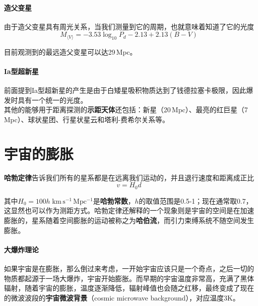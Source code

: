 \documentclass[openany]{ctexbook}
\begin{document}
\paragraph{造父变星}
由于造父变星具有周光关系，当我们测量到它的周期，也就意味着知道了它的光度
\begin{equation}
  M_{\langle V\rangle}=-3.53\log_{10}P_d-2.13+2.13(B-V)
\end{equation}

目前观测到的最远造父变星可以达29\,Mpc。

\paragraph{Ia型超新星}
前面提到Ia型超新星的产生是由于白矮星吸积物质达到了钱德拉塞卡极限，因此爆发时具有一个统一的光度。\mbox{}\\

其他的能够用于距离探测的\textbf{示距天体}还包括：新星（20\,Mpc）、最亮的红巨星（7\,Mpc）、球状星团、行星状星云和塔利-费希尔关系等。

\section{宇宙的膨胀}
\textbf{哈勃定律}告诉我们所有的星系都是在远离我们运动的，并且退行速度和距离成正比
\begin{equation}
  v=H_0d
\end{equation}

其中$H_0=100h\;\mathrm{km\,s^{-1}\,Mpc^{-1}}$是\textbf{哈勃常数}，$h$的取值范围是0.5-1；现在通常取0.7，这显然也可以作为测距方式。哈勃定律还解释的一个现象则是宇宙的空间是在加速膨胀的，星系随着空间膨胀的运动被称之为\textbf{哈伯流}，而引力束缚系统不随空间发生膨胀。

\paragraph{大爆炸理论}
如果宇宙是在膨胀，那么倒过来考虑，一开始宇宙应该只是一个奇点，之后一切的物质都起源于一场大爆炸，宇宙开始膨胀。而早期的宇宙温度非常高，充满了黑体辐射，随着宇宙的膨胀，温度逐渐降低，辐射峰值也会随之红移，最终变成了现在的微波波段的\textbf{宇宙微波背景}（cosmic microwave background），对应温度3\;K。
\end{document}
